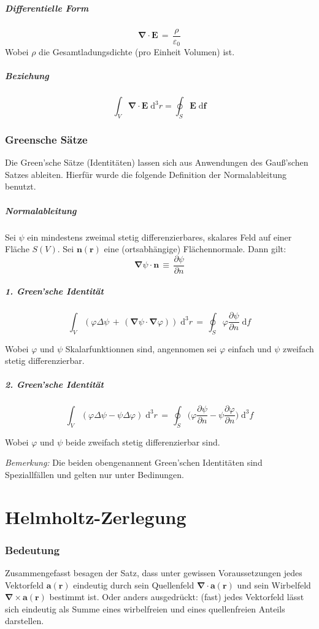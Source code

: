 \documentclass[titlepage,11pt,a4paper,ngerman]{report}
\renewcommand{\vec}[1]{\boldsymbol{#1}}
\renewcommand{\epsilon}{\varepsilon}
\newcommand{\vabla}{\boldsymbol{\nabla}}
\renewcommand{\paragraph}[1]{\subsubsection{#1}}
\begin{document}
\subparagraph{Differentielle Form}
\[\vec{\nabla}\cdot\vec{E}\,=\,\frac{\rho}{\epsilon_0}\]
Wobei $\rho$ die Gesamtladungsdichte (pro Einheit Volumen) ist.

\subparagraph{Beziehung}
$$\int_{V} \vabla \cdot \vec{E}\;\mathrm{d}^{3}r = \oint_{S}\vec{E}\;\mathrm{d}\vec{f}$$
\hfill \break

\paragraph{Greensche Sätze}
Die Green’sche Sätze (Identitäten) lassen sich aus Anwendungen des Gauß’schen Satzes ableiten. Hierfür wurde die folgende Definition der Normalableitung benutzt.

\subparagraph{Normalableitung} \hfill \break
Sei $\psi$ ein mindestens zweimal stetig differenzierbares, skalares Feld auf einer Fläche $S(V)$. Sei $\vec{n}(\vec{r})$ eine (ortsabhängige) Flächennormale. Dann gilt:
\[\vec{\nabla}\psi\cdot\vec{n}\,\equiv\,\frac{\partial\psi}{\partial n}\]

\subparagraph{1. Green'sche Identität}
\[\int_V(\varphi\Delta\psi\,+\,(\vabla\psi\cdot\vabla\varphi))\;\mathrm{d}^3r\,=\,\oint_{S}\varphi\frac{\partial\psi}{\partial n}\;\mathrm{d}f\]

Wobei $\varphi$ und $\psi$ Skalarfunktionnen sind, angennomen sei $\varphi$ einfach und $\psi$ zweifach stetig differenzierbar.

\subparagraph{2. Green'sche Identität}
\[\int_V (\varphi\Delta\psi-\psi\Delta\varphi)\;\mathrm{d}^3r\,=\,\oint_{S}\bigg(\varphi\frac{\partial\psi}{\partial n}-\psi\frac{\partial\varphi}{\partial n}\bigg)\;\mathrm{d}^3f\]

Wobei $\varphi$ und $\psi$ beide zweifach stetig differenzierbar sind.

\bigskip
\emph{Bemerkung:} Die beiden obengenannent Green'schen Identitäten sind Speziallfällen und gelten nur unter Bedinungen.

\section{Helmholtz-Zerlegung}
\paragraph{Bedeutung}
Zusammengefasst besagen der Satz, dass unter gewissen Voraussetzungen jedes Vektorfeld $\vec{a}(\vec{r})$ eindeutig durch sein Quellenfeld $\vabla\cdot\vec{a}(\vec{r})$ und sein Wirbelfeld $\vabla\times\vec{a}(\vec{r})$ bestimmt ist. Oder anders ausgedrückt: (fast) jedes Vektorfeld lässt sich eindeutig als Summe eines wirbelfreien und eines quellenfreien Anteils darstellen.
\end{document}
